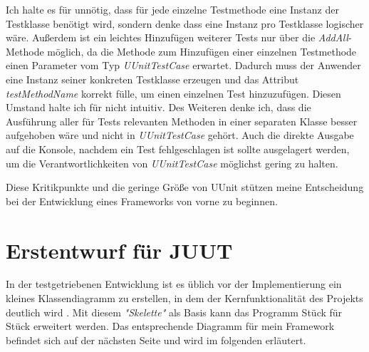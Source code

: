 Ich halte es für unnötig, dass für jede einzelne Testmethode eine Instanz der Testklasse benötigt wird, sondern denke dass eine Instanz pro Testklasse logischer wäre. Außerdem ist ein leichtes Hinzufügen weiterer Tests nur über die \textit{AddAll}-Methode möglich, da die Methode zum Hinzufügen einer einzelnen Testmethode einen Parameter vom Typ \textit{UUnitTestCase} erwartet. Dadurch muss der Anwender eine Instanz seiner konkreten Testklasse erzeugen und das Attribut \textit{testMethodName} korrekt fülle, um einen einzelnen Test hinzuzufügen. Diesen Umstand halte ich für nicht intuitiv. Des Weiteren denke ich, dass die Ausführung aller für Tests relevanten Methoden in einer separaten Klasse besser aufgehoben wäre und nicht in \textit{UUnitTestCase} gehört. Auch die direkte Ausgabe auf die Konsole, nachdem ein Test fehlgeschlagen ist sollte ausgelagert werden, um die Verantwortlichkeiten von \textit{UUnitTestCase} möglichst gering zu halten.

Diese Kritikpunkte und die geringe Größe von UUnit stützen meine Entscheidung bei der Entwicklung eines Frameworks von vorne zu beginnen.

\section{Erstentwurf für JUUT}

In der testgetriebenen Entwicklung ist es üblich vor der Implementierung ein kleines Klassendiagramm zu erstellen, in dem der Kernfunktionalität des Projekts deutlich wird \cite[Seite 32-37]{FRE10}. Mit diesem \textit{"Skelette"} als Basis kann das Programm Stück für Stück erweitert werden. Das entsprechende Diagramm für mein Framework befindet sich auf der nächsten Seite und wird im folgenden erläutert.
\pagebreak

